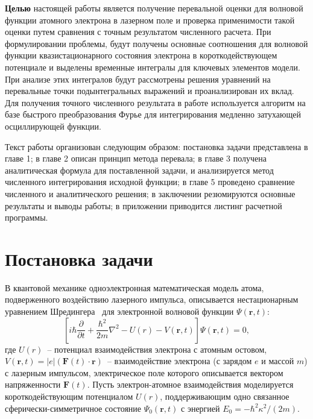 \documentclass[14pt, a4paper]{article}
\numberwithin{figure}{section}
\numberwithin{equation}{section}
\newcommand{\sectionbreak}{\clearpage}
\newcommand{\vF}{\mathbf{F}}
\newcommand{\vr}{\mathbf{r}}
\begin{document}
\textbf{Целью} настоящей работы является получение перевальной оценки для волновой функции атомного электрона в лазерном поле и проверка применимости такой оценки путем сравнения с точным результатом численного расчета. При формулировании проблемы, будут получены основные соотношения для волновой функции квазистационарного состояния электрона в короткодействующем потенциале и выделены временные интегралы для ключевых элементов модели. При анализе этих интегралов будут рассмотрены решения уравнений на перевальные точки подынтегральных выражений и проанализирован их вклад. Для получения точного численного результата в работе используется алгоритм на базе быстрого преобразования Фурье для интегрирования медленно затухающей осциллирующей функции.

Текст работы организован следующим образом: постановка задачи представлена в главе 1; в главе 2 описан принцип метода перевала; в главе 3 получена аналитическая формула для поставленной задачи, и анализируется метод численного интегрирования исходной функции; в главе 5 проведено сравнение численного и аналитического решения; в заключении резюмируются основные результаты и выводы работы; в приложении приводится листинг расчетной программы.
\sectionbreak


\section{Постановка задачи}

В квантовой механике одноэлектронная математическая модель атома, подверженного воздействию
лазерного импульса, описывается нестационарным уравнением Шредингера~\cite{LL} для электронной волновой функции $\Psi(\vr,t)$:
\begin{equation}
\label{TDSE}
\left[i\hbar\frac{\partial}{\partial t} + \frac{\hbar^2}{2m}\nabla^2 - U(r) - V(\vr,t)\right]\Psi(\vr,t) = 0,
\end{equation}
где $U(r)$~-- потенциал взаимодействия электрона с атомным остовом, $V(\vr,t)=|e|(\vF(t)\cdot\vr)$~-- взаимодействие электрона (с зарядом $e$ и массой $m$) с лазерным импульсом, электрическое поле которого описывается вектором напряженности $\vF(t)$. Пусть электрон-атомное взаимодействия моделируется короткодействующим потенциалом $U(r)$, поддерживающим одно связанное сферически-симметричное состояние $\Psi_0(\vr,t)$ с энергией $E_0=-\hbar^2\kappa^2/(2m)$.
\end{document}
